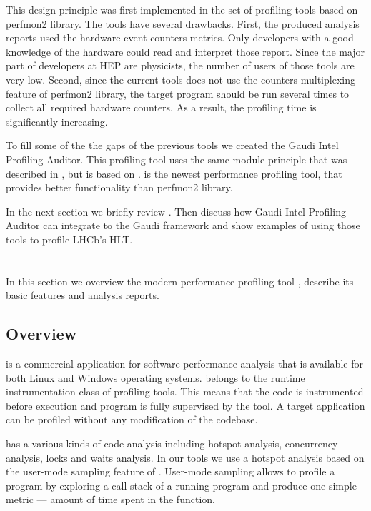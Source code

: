 \documentclass[a4paper]{jpconf}
\begin{document}
This design principle was first implemented in the set of profiling tools based on perfmon2 \cite{perfmon2} library.  
The tools have several drawbacks. First, the produced analysis reports  used the  hardware event counters metrics. 
Only developers with a good knowledge of the hardware could read and interpret those report. Since the major part of 
developers at HEP are physicists, the number of users of those tools are very low. Second, since the current tools 
does not use the counters multiplexing feature of perfmon2 library, the target program should be run several times 
to collect all required hardware counters. As a result, the profiling time is significantly increasing.

To fill some of the the gaps of the previous tools we created the Gaudi Intel Profiling Auditor. This profiling tool 
uses the same module principle that was described in \cite{modular},  but is based on \iamp \cite{vtune}. 
\amp is the newest performance profiling tool, that provides better functionality than perfmon2 library. 

In the next section we briefly review \iamp. Then discuss how Gaudi Intel Profiling Auditor can integrate \amp to 
the Gaudi framework and show examples of using those tools to profile LHCb's HLT.

\section{\iamp}
In this section we overview the modern performance profiling tool \iamp, describe its basic features and analysis 
reports.

\subsection{Overview}
\iamp is a commercial application for software performance analysis that is available for both Linux and Windows 
operating systems. \amp belongs to the runtime instrumentation class of profiling tools. This means that the code is 
instrumented before execution and program is fully supervised by the tool. A target application can be profiled without 
any modification of the codebase.

\iamp has a various kinds of code analysis including hotspot analysis, concurrency analysis, locks and waits analysis. 
In our tools we use a hotspot analysis based on the user-mode  sampling feature of \amp. User-mode sampling allows 
to profile a program by exploring a call stack of a running program and produce one simple metric --- amount of time 
spent in the function. 
\end{document}
